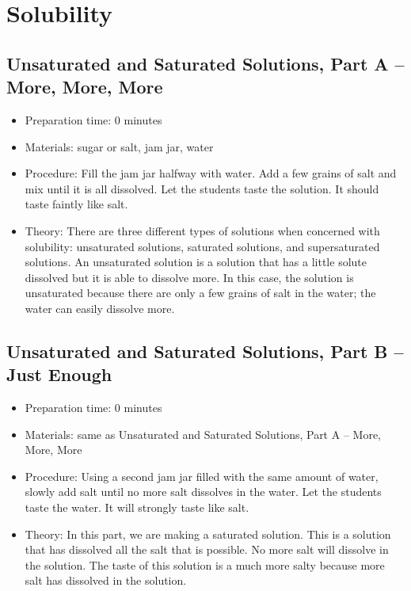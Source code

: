 \section{Solubility}

\subsection{Unsaturated and Saturated Solutions, Part A -- More, More, More}
\begin{itemize}
\item{Preparation time: 0 minutes}
\item{Materials: sugar or salt, jam jar, water}
\item{Procedure: Fill the jam jar halfway with water. Add a few grains of salt and mix until it is all dissolved. Let the students taste the solution. It should taste faintly like salt.}
\item{Theory: There are three different types of solutions when concerned with solubility: unsaturated solutions, saturated solutions, and supersaturated solutions. An unsaturated solution is a solution that has a little solute dissolved but it is able to dissolve more. In this case, the solution is unsaturated because there are only a few grains of salt in the water; the water can easily dissolve more.}
\end{itemize}

\subsection{Unsaturated and Saturated Solutions, Part B -- Just Enough}
\begin{itemize}
\item{Preparation time: 0 minutes}
\item{Materials: same as Unsaturated and Saturated Solutions, Part A -- More, More, More}
\item{Procedure: Using a second jam jar filled with the same amount of water, slowly add salt until no more salt dissolves in the water. Let the students taste the water. It will strongly taste like salt.}
\item{Theory: In this part, we are making a saturated solution. This is a solution that has dissolved all the salt that is possible. No more salt will dissolve in the solution. The taste of this solution is a much more salty because more salt has dissolved in the solution.}
\end{itemize}

